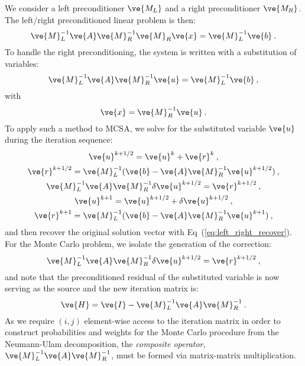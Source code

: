 \documentclass[letterpaper,11pt]{article}
\begin{document}
We consider a left preconditioner $\ve{M_L}$ and a right
preconditioner $\ve{M_R}$. The left/right preconditioned linear
problem is then:
\begin{equation}
  \ve{M}_L^{-1}\ve{A}\ve{M}_R^{-1}\ve{M}_R\ve{x} = \ve{M}_L^{-1}\ve{b}\:.
  \label{eq:left_right_linear_problem}
\end{equation}
To handle the right preconditioning, the system is written with a
substitution of variables:
\begin{equation}
  \ve{M}_L^{-1}\ve{A}\ve{M}_R^{-1}\ve{u} = \ve{M}_L^{-1}\ve{b}\:,
  \label{eq:left_right_subs_problem}
\end{equation}
with
\begin{equation}
  \ve{x} = \ve{M}_R^{-1}\ve{u}\:.
  \label{eq:left_right_recover}
\end{equation}
To apply such a method to MCSA, we solve for the substituted variable
$\ve{u}$ during the iteration sequence:
\begin{subequations}
  \begin{gather}
    \ve{u}^{k+1/2} = \ve{u}^k + \ve{r}^k\:,\\
    \ve{r}^{k+1/2} = \ve{M}_L^{-1}(\ve{b}-\ve{A}\ve{M}_R^{-1}\ve{u}^{k+1/2})\:,\\ 
    \ve{M}_L^{-1}\ve{A}\ve{M}_R^{-1}\delta\ve{u}^{k+1/2} = \ve{r}^{k+1/2}\:,\\ 
    \ve{u}^{k+1} = \ve{u}^{k+1/2} + \delta \ve{u}^{k+1/2}\:,\\
    \ve{r}^{k+1} = \ve{M}_L^{-1}(\ve{b}-\ve{A}\ve{M}_R^{-1}\ve{u}^{k+1})\:,
  \end{gather}
  \label{eq:left_right_mcsa}
\end{subequations}
and then recover the original solution vector with
Eq~(\ref{eq:left_right_recover}). For the Monte Carlo problem, we
isolate the generation of the correction:
\begin{equation}
  \ve{M}_L^{-1}\ve{A}\ve{M}_R^{-1}\delta\ve{u}^{k+1/2} = \ve{r}^{k+1/2}\:,
  \label{eq:left_right_correction}
\end{equation}
and note that the preconditioned residual of the substituted variable
is now serving as the source and the new iteration matrix is:
\begin{equation}
  \ve{H} = \ve{I} - \ve{M}_L^{-1}\ve{A}\ve{M}_R^{-1}\:.
  \label{eq:left_right_iteration_matrix}
\end{equation}
As we require $(i,j)$ element-wise access to the iteration matrix in
order to construct probabilities and weights for the Monte Carlo
procedure from the Neumann-Ulam decomposition, the \textit{composite
  operator}, $\ve{M}_L^{-1}\ve{A}\ve{M}_R^{-1}$, must be formed via
matrix-matrix multiplication. 
\end{document}
